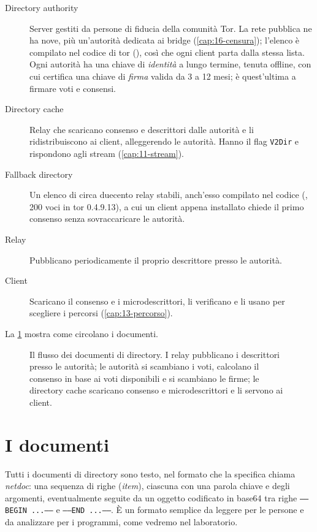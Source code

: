 \begin{description}
  \item[Directory authority] Server gestiti da persone di fiducia della comunità Tor. La rete pubblica ne ha nove, più un'autorità dedicata ai bridge (\cref{cap:16-censura}); l'elenco è compilato nel codice di tor (), così che ogni client parta dalla stessa lista. Ogni autorità ha una chiave di \emph{identità} a lungo termine, tenuta offline, con cui certifica una chiave di \emph{firma} valida da 3 a 12 mesi; è quest'ultima a firmare voti e consensi.
  \item[Directory cache] Relay che scaricano consenso e descrittori dalle autorità e li ridistribuiscono ai client, alleggerendo le autorità. Hanno il flag \texttt{V2Dir} e rispondono agli stream  (\cref{cap:11-stream}).
  \item[Fallback directory] Un elenco di circa duecento relay stabili, anch'esso compilato nel codice (, 200 voci in tor 0.4.9.13), a cui un client appena installato chiede il primo consenso senza sovraccaricare le autorità.
  \item[Relay] Pubblicano periodicamente il proprio descrittore presso le autorità.
  \item[Client] Scaricano il consenso e i microdescrittori, li verificano e li usano per scegliere i percorsi (\cref{cap:13-percorso}).
\end{description}

La \cref{fig:dir-flusso} mostra come circolano i documenti.

\begin{figure}[htbp]
\centering

\caption{Il flusso dei documenti di directory. I relay pubblicano i descrittori presso le autorità; le autorità si scambiano i voti, calcolano il consenso in base ai voti disponibili e si scambiano le firme; le directory cache scaricano consenso e microdescrittori e li servono ai client.}
\label{fig:dir-flusso}
\end{figure}

\section{I documenti}\label{sec:dir-documenti}

Tutti i documenti di directory sono testo, nel formato che la specifica chiama \emph{netdoc}: una sequenza di righe (\emph{item}), ciascuna con una parola chiave e degli argomenti, eventualmente seguite da un oggetto codificato in base64 tra righe \texttt{-----BEGIN ...-----} e \texttt{-----END ...-----}. È un formato semplice da leggere per le persone e da analizzare per i programmi, come vedremo nel laboratorio.

